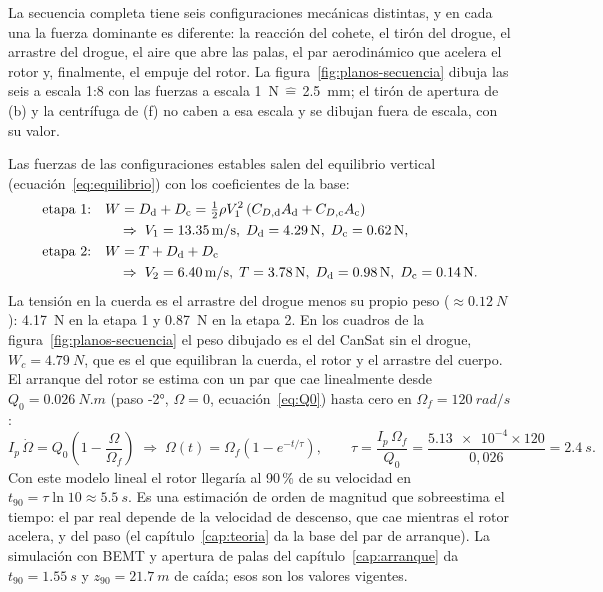 La secuencia completa tiene seis configuraciones mecánicas distintas, y en cada una la
fuerza dominante es diferente: la reacción del cohete, el tirón del drogue, el arrastre
del drogue, el aire que abre las palas, el par aerodinámico que acelera el rotor y,
finalmente, el empuje del rotor. La figura~\ref{fig:planos-secuencia} dibuja las seis a
escala 1:8 con las fuerzas a escala \SI{1}{N}\,$\widehat{=}$\,\SI{2.5}{mm}; el tirón de
apertura de (b) y la centrífuga de (f) no caben a esa escala y se dibujan fuera de escala,
con su valor.

Las fuerzas de las configuraciones estables salen del equilibrio vertical
(ecuación~\ref{eq:equilibrio}) con los coeficientes de la base:
\begin{align}
  \text{etapa 1:}\quad & W = D_\text{d}+D_\text{c} = \tfrac12\rho V_1^2\,(C_{D,\text{d}}A_\text{d}+C_{D,\text{c}}A_\text{c})\notag\\
     &\quad\Rightarrow\; V_1=\SI{13.35}{m/s},\; D_\text{d}=\SI{4.29}{N},\; D_\text{c}=\SI{0.62}{N},
  \label{eq:planos-eq1}\\
  \text{etapa 2:}\quad & W = T + D_\text{d}+D_\text{c}\notag\\
     &\quad\Rightarrow\; V_2=\SI{6.40}{m/s},\; T=\SI{3.78}{N},\; D_\text{d}=\SI{0.98}{N},\; D_\text{c}=\SI{0.14}{N}.
  \label{eq:planos-eq2}
\end{align}
La tensión en la cuerda es el arrastre del drogue menos su propio peso ($\approx\SI{0.12}{N}$):
\SI{4.17}{N} en la etapa 1 y \SI{0.87}{N} en la etapa 2. En los cuadros de la
figura~\ref{fig:planos-secuencia} el peso dibujado es el del CanSat sin el drogue,
$W_c=\SI{4.79}{N}$, que es el que equilibran la cuerda, el rotor y el arrastre del cuerpo. El arranque del rotor se estima con
un par que cae linealmente desde $Q_0=\SI{0.026}{N.m}$ (paso \ang{-2}, $\Omega=0$, ecuación~\ref{eq:Q0})
hasta cero en $\Omega_f=\SI{120}{rad/s}$:
\begin{equation}
  I_p\,\dot\Omega = Q_0\left(1-\frac{\Omega}{\Omega_f}\right)
  \;\Rightarrow\;
  \Omega(t)=\Omega_f\left(1-e^{-t/\tau}\right),\qquad
  \tau=\frac{I_p\,\Omega_f}{Q_0}=\frac{\num{5.13e-4}\times120}{0{,}026}=\SI{2.4}{s}.
  \label{eq:planos-arranque}
\end{equation}
Con este modelo lineal el rotor llegaría al 90\,\% de su velocidad en
$t_{90}=\tau\ln10\approx\SI{5.5}{s}$. Es una estimación de orden de magnitud que
sobreestima el tiempo: el par real depende de la velocidad de descenso, que cae mientras el
rotor acelera, y del paso (el capítulo~\ref{cap:teoria} da la base del par de arranque). La
simulación con BEMT y apertura de palas del capítulo~\ref{cap:arranque} da
$t_{90}=\SI{1.55}{s}$ y $z_{90}=\SI{21.7}{m}$ de caída; esos son los valores vigentes.

